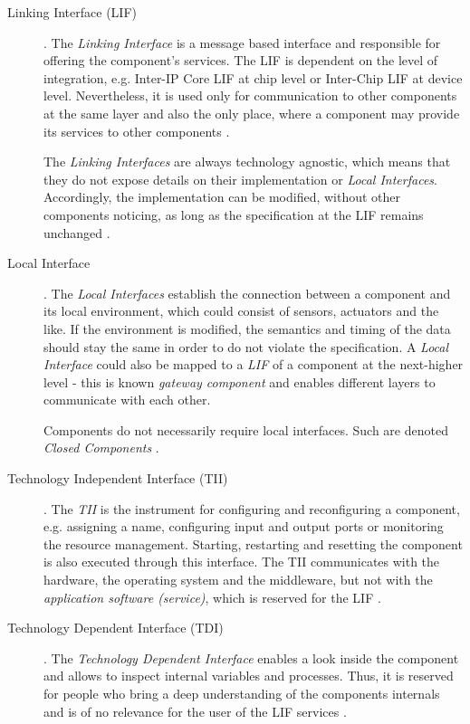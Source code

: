 \begin{description}
\item [Linking Interface (LIF)]. 
The \emph{Linking Interface} is a message based interface and responsible for offering the component's services. The LIF is dependent on the level of integration, e.g. Inter-IP Core LIF at chip level or Inter-Chip LIF at device level. Nevertheless, it is used only for communication to other components at the same layer and also the only place, where a component may provide its services to other components \cite[p.9]{genesys}.

The \emph{Linking Interfaces} are always technology agnostic, which means that they do not expose details on their implementation or \emph{Local Interfaces}. Accordingly, the implementation can be modified, without other components noticing, as long as the specification at the LIF remains unchanged \cite[p.9, 40-41]{genesys}.

\item [Local Interface]. 
The \emph{Local Interfaces} establish the connection between a component and its local environment, which could consist of sensors, actuators and the like. If the environment is modified, the semantics and timing of the data should stay the same in order to do not violate the specification. A \emph{Local Interface} could also be mapped to a \emph{LIF} of a component at the next-higher level - this is known \emph{gateway component} and enables different layers to communicate with each other.

Components do not necessarily require local interfaces. Such are denoted \emph{Closed Components} \cite[p.40-41]{genesys}.

\item [Technology Independent Interface (TII)].
The \emph{TII} is the instrument for configuring and reconfiguring a component, e.g. assigning a name, configuring input and output ports or monitoring the resource management. Starting, restarting and resetting the component is also executed through this interface. The TII communicates with the hardware, the operating system and the middleware, but not with the \emph{application software (service)}, which is reserved for the LIF \cite[p.40-41]{genesys}.

\item [Technology Dependent Interface (TDI)]. 
The \emph{Technology Dependent Interface} enables a look inside the component and allows to inspect internal variables and processes. Thus, it is reserved for people who bring a deep understanding of the components internals and is of no relevance for the user of the LIF services \cite[p.40-41]{genesys}. 
\end{description}

